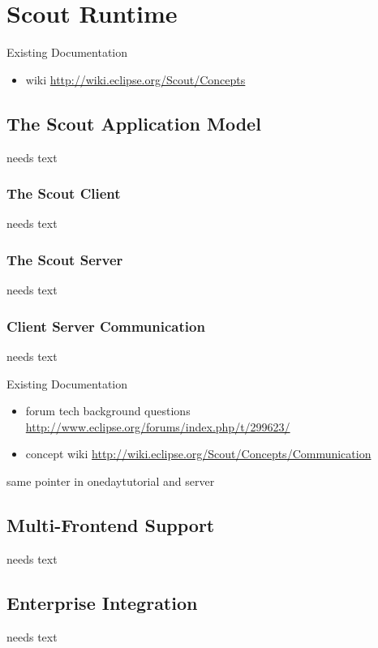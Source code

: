 \documentclass[a4paper,10pt,twoside]{book}
\begin{document}
  \sloppy
\fi


\chapter{Scout Runtime}

\noindent Existing Documentation
\begin{itemize}
  \item wiki \url{http://wiki.eclipse.org/Scout/Concepts}
\end{itemize}

\section{The Scout Application Model}
needs text

\subsection{The Scout Client}
needs text

\subsection{The Scout Server}
needs text

\subsection{Client Server Communication}
needs text

\noindent Existing Documentation
\begin{itemize}
  \item forum tech background questions \url{http://www.eclipse.org/forums/index.php/t/299623/}
  \item concept wiki \url{http://wiki.eclipse.org/Scout/Concepts/Communication}
\end{itemize}

same pointer in onedaytutorial and server

\section{Multi-Frontend Support}
needs text

\section{Enterprise Integration}
needs text

\ifx\wholebook\relax\else
   
   
\end{document}
